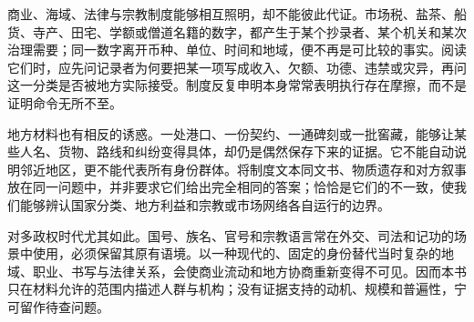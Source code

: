 商业、海域、法律与宗教制度能够相互照明，却不能彼此代证。市场税、盐茶、船货、寺产、田宅、学额或僧道名籍的数字，都产生于某个抄录者、某个机关和某次治理需要；同一数字离开币种、单位、时间和地域，便不再是可比较的事实。阅读它们时，应先问记录者为何要把某一项写成收入、欠额、功德、违禁或灾异，再问这一分类是否被地方实际接受。制度反复申明本身常常表明执行存在摩擦，而不是证明命令无所不至。

地方材料也有相反的诱惑。一处港口、一份契约、一通碑刻或一批窖藏，能够让某些人名、货物、路线和纠纷变得具体，却仍是偶然保存下来的证据。它不能自动说明邻近地区，更不能代表所有身份群体。将制度文本同文书、物质遗存和对方叙事放在同一问题中，并非要求它们给出完全相同的答案；恰恰是它们的不一致，使我们能够辨认国家分类、地方利益和宗教或市场网络各自运行的边界。

对多政权时代尤其如此。国号、族名、官号和宗教语言常在外交、司法和记功的场景中使用，必须保留其原有语境。以一种现代的、固定的身份替代当时复杂的地域、职业、书写与法律关系，会使商业流动和地方协商重新变得不可见。因而本书只在材料允许的范围内描述人群与机构；没有证据支持的动机、规模和普遍性，宁可留作待查问题。

